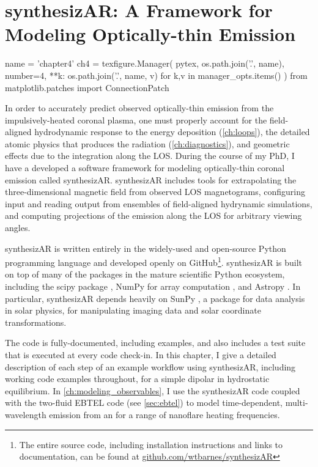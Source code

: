 \chapter{synthesizAR: A Framework for Modeling Optically-thin Emission}

\begin{pycode}[chapter4]
name = 'chapter4'
ch4 = texfigure.Manager(
    pytex,
    os.path.join('.', name),
    number=4,
    **{k: os.path.join('.', name, v) for k,v in manager_opts.items()}
)
from matplotlib.patches import ConnectionPatch
\end{pycode}

In order to accurately predict observed optically-thin emission from the impulsively-heated coronal plasma, one must properly account for the field-aligned hydrodynamic response to the energy deposition (\autoref{ch:loops}), the detailed atomic physics that produces the radiation (\autoref{ch:diagnostics}), and geometric effects due to the integration along the LOS. During the course of my PhD, I have a developed a software framework for modeling optically-thin coronal emission called synthesizAR. synthesizAR includes tools for extrapolating the three-dimensional magnetic field from observed LOS magnetograms, configuring input and reading output from ensembles of field-aligned hydrynamic simulations, and computing projections of the emission along the LOS for arbitrary viewing angles. 

synthesizAR is written entirely in the widely-used and open-source Python programming language and developed openly on GitHub\footnote{The entire source code, including installation instructions and links to documentation, can be found at \href{https://github.com/wtbarnes/synthesizAR}{github.com/wtbarnes/synthesizAR}}. synthesizAR is built on top of many of the packages in the mature scientific Python ecosystem, including the scipy package \citep{jones_scipy_2001}, NumPy for array computation \citep{oliphant_guide_2006}, and Astropy \citep{the_astropy_collaboration_astropy_2018}. In particular, synthesizAR depends heavily on SunPy \citep{sunpy_community_sunpypython_2015}, a package for data analysis in solar physics, for manipulating imaging data and solar coordinate transformations.

The code is fully-documented, including examples, and also includes a test suite that is executed at every code check-in. In this chapter, I give a detailed description of each step of an example workflow using synthesizAR, including working code examples throughout, for a simple dipolar \AR{} in hydrostatic equilibrium. In \autoref{ch:modeling_observables}, I use the synthesizAR code coupled with the two-fluid EBTEL code (see \autoref{sec:ebtel}) to model time-dependent, multi-wavelength emission from an \AR{} for a range of nanoflare heating frequencies.

